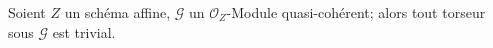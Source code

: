 \begin{proposition}[16.5.16]
\label{IV.16.5.16}
Soient $Z$ un schéma affine, $\mathscr{G}$ un $\mathcal{O}_Z$-Module
quasi-cohérent; alors tout torseur sous $\mathscr{G}$ est trivial.
\end{proposition}

